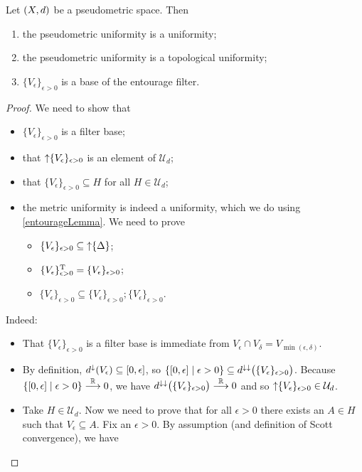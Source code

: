 \begin{lemma}
Let $\left( X,d \right)$ be a pseudometric space. Then
\begin{enumerate}
\item the pseudometric uniformity is a uniformity;
\item the pseudometric uniformity is a topological uniformity;
\item $\{V_\epsilon\}_{\epsilon>0}$ is a base of the entourage filter.
\end{enumerate}
\end{lemma}
\begin{proof}
We need to show that
\begin{itemize}
\item $\{V_\epsilon\}_{\epsilon>0}$ is a filter base;
\item that $\operatorname{\uparrow}\{V_\epsilon\}_{\epsilon>0}$ is an element of $\mathcal{U}_d$;
\item that $\{V_\epsilon\}_{\epsilon>0}\subseteq H$ for all $H\in \mathcal{U}_d$;
\item the metric uniformity is indeed a uniformity, which we do using \ref{entourageLemma}. We need to prove
\begin{itemize}
\item $\{V_\epsilon\}_{\epsilon>0}\subseteq\operatorname{\uparrow}\{\Delta\}$;
\item $\{V_\epsilon\}_{\epsilon>0}^{\mathrm{T}} = \{V_\epsilon\}_{\epsilon>0}$;
\item $\{V_\epsilon\}_{\epsilon>0} \subseteq \{V_\epsilon\}_{\epsilon>0}; \{V_\epsilon\}_{\epsilon>0}$.
\end{itemize}
\end{itemize}
Indeed:
\begin{itemize}
\item That $\{V_\epsilon\}_{\epsilon>0}$ is a filter base is immediate from $V_\epsilon \cap V_\delta = V_{\min(\epsilon, \delta)}$.
\item By definition, $d^{\imf}(V_\epsilon) \subseteq \interval{0,\epsilon}$, so $\setbuilder{\interval{0,\epsilon}}{\epsilon>0} \subseteq d^{\imf\imf}\big(\{V_\epsilon\}_{\epsilon>0}\big)$. Because $\setbuilder{\interval{0,\epsilon}}{\epsilon>0} \overset{\R}{\longrightarrow} 0$, we have $d^{\downarrow\downarrow}\big(\{V_\epsilon\}_{\epsilon>0}\big) \overset{\mathbb{R}}{\longrightarrow} 0$ and so $\operatorname{\uparrow}\{V_\epsilon\}_{\epsilon>0} \in \mathcal{U}_d$.
\item Take $H\in \mathcal{U}_d$. 
Now we need to prove that for all $\epsilon >0$ there exists an $A\in H$ such that $V_\epsilon \subseteq A$. Fix an $\epsilon > 0$. By assumption (and definition of Scott convergence), we have

\end{itemize}
\end{proof}
